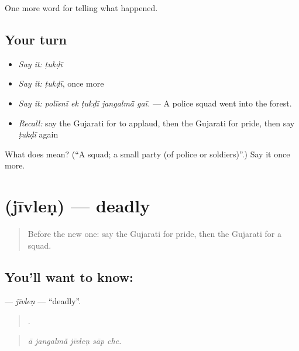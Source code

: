 \begin{grammarlens}[title={What you've built}]
One more word for telling what happened.
\end{grammarlens}

\subsection*{Your turn}
\begin{itemize}
\raggedright
  \item \emph{Say it:} \emph{ṭukḍī}
  \item \emph{Say it:} \emph{ṭukḍī}, once more
  \item \emph{Say it:} \emph{polīsnī ek ṭukḍī jangalmā̃ gaī.} — A police squad went into the forest.
  \item \emph{Recall:} say the Gujarati for to applaud, then the Gujarati for pride, then say \emph{ṭukḍī} again
\end{itemize}

\begin{tcolorbox}[breakable,colback=teal!4,colframe=teal!35!black,title={Before you move on}]
What does  mean? (\textquotedblleft{}A squad; a small party (of police or soldiers)\textquotedblright{}.) Say it once more.
\end{tcolorbox}
\section[\texorpdfstring{\gu{જીવલેણ} (jīvleṇ)}{જીવલેણ (jīvleṇ)}]{ (jīvleṇ) — deadly}

\label{lesson:GU-C310-jivlen}



\begin{quote}
Before the new one: say the Gujarati for pride, then the Gujarati for a squad.
\end{quote}

\subsection*{You'll want to know: }
\textbf{} — \emph{jīvleṇ} — \textquotedblleft{}deadly\textquotedblright{}.

\begin{quote}
    .
\end{quote}

\begin{quote}
\emph{ā jangalmā̃ jīvleṇ sāp che.}
\end{quote}

